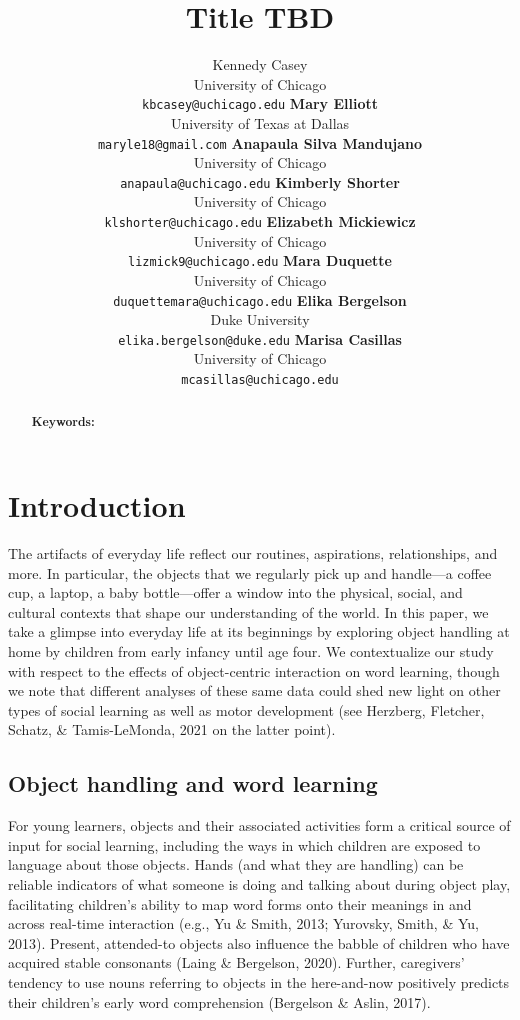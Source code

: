 \documentclass[10pt, letterpaper]{article}
\title{Title TBD}
\author{Kennedy Casey \\
        University of Chicago \\
        \texttt{\normalsize{kbcasey@uchicago.edu}}
\And \textbf{Mary Elliott} \\
             University of Texas at Dallas \\
             \texttt{\normalsize{maryle18@gmail.com}}
\And \textbf{Anapaula Silva Mandujano} \\
             University of Chicago \\
             \texttt{\normalsize{anapaula@uchicago.edu}}   
\And \textbf{Kimberly Shorter} \\
             University of Chicago \\
             \texttt{\normalsize{klshorter@uchicago.edu}}
\AND \textbf{Elizabeth Mickiewicz} \\
             University of Chicago \\
             \texttt{\normalsize{lizmick9@uchicago.edu}}         
\And \textbf{Mara Duquette} \\
             University of Chicago \\
             \texttt{\normalsize{duquettemara@uchicago.edu}}
\And \textbf{Elika Bergelson} \\
             Duke University \\
             \texttt{\normalsize{elika.bergelson@duke.edu}}
\And \textbf{Marisa Casillas} \\
             University of Chicago \\
             \texttt{\normalsize{mcasillas@uchicago.edu}}}
\begin{document}
\maketitle

\begin{abstract}


\textbf{Keywords:}

\end{abstract}

\hypertarget{introduction}{%
\section{Introduction}\label{introduction}}

The artifacts of everyday life reflect our routines, aspirations,
relationships, and more. In particular, the objects that we regularly
pick up and handle---a coffee cup, a laptop, a baby bottle---offer a
window into the physical, social, and cultural contexts that shape our
understanding of the world. In this paper, we take a glimpse into
everyday life at its beginnings by exploring object handling at home by
children from early infancy until age four. We contextualize our study
with respect to the effects of object-centric interaction on word
learning, though we note that different analyses of these same data
could shed new light on other types of social learning as well as motor
development (see Herzberg, Fletcher, Schatz, \& Tamis-LeMonda, 2021 on
the latter point).

\hypertarget{object-handling-and-word-learning}{%
\subsection{Object handling and word
learning}\label{object-handling-and-word-learning}}

For young learners, objects and their associated activities form a
critical source of input for social learning, including the ways in
which children are exposed to language about those objects. Hands (and
what they are handling) can be reliable indicators of what someone is
doing and talking about during object play, facilitating children's
ability to map word forms onto their meanings in and across real-time
interaction (e.g., Yu \& Smith, 2013; Yurovsky, Smith, \& Yu, 2013).
Present, attended-to objects also influence the babble of children who
have acquired stable consonants (Laing \& Bergelson, 2020). Further,
caregivers' tendency to use nouns referring to objects in the
here-and-now positively predicts their children's early word
comprehension (Bergelson \& Aslin, 2017).
\end{document}
